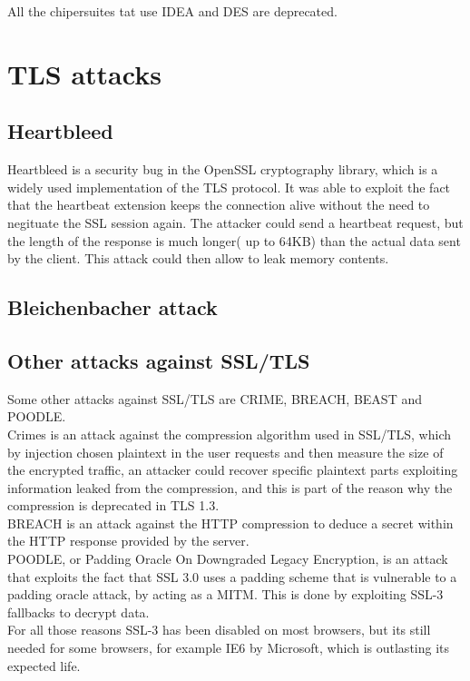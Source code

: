 \documentclass{report}
\begin{document}
All the chipersuites tat use IDEA and DES are deprecated.

\section{TLS attacks}
\subsection{Heartbleed}
Heartbleed is a security bug in the OpenSSL cryptography library,
which is a widely used implementation of the TLS protocol. It was able
to exploit the fact that the heartbeat extension keeps the connection
alive without the need to negituate the SSL session again. The
attacker could send a heartbeat request, but the length of the 
response is much longer( up to 64KB) than the actual data sent by the
client. This attack could then allow to leak memory contents.

\subsection{Bleichenbacher attack}

\subsection{Other attacks against SSL/TLS}
Some other attacks against SSL/TLS are CRIME, BREACH, BEAST and
POODLE.\\
Crimes is an attack against the compression algorithm used in SSL/TLS,
which by injection chosen plaintext in the user requests and then
measure the size of the encrypted traffic, an attacker could recover
specific plaintext parts exploiting information leaked from the
compression, and this is part of the reason why the compression is
deprecated in TLS 1.3.\\
BREACH is an attack against the HTTP compression to deduce a secret
within the HTTP response provided by the server.\\
POODLE, or Padding Oracle On Downgraded Legacy Encryption, is an 
attack that exploits the fact that SSL 3.0 uses a padding scheme that
is vulnerable to a padding oracle attack, by acting as a MITM. This is
done by exploiting SSL-3 fallbacks to decrypt data.\\
For all those reasons SSL-3 has been disabled on most browsers, but
its still needed for some browsers, for example IE6 by Microsoft,
which is outlasting its expected life.
\end{document}
